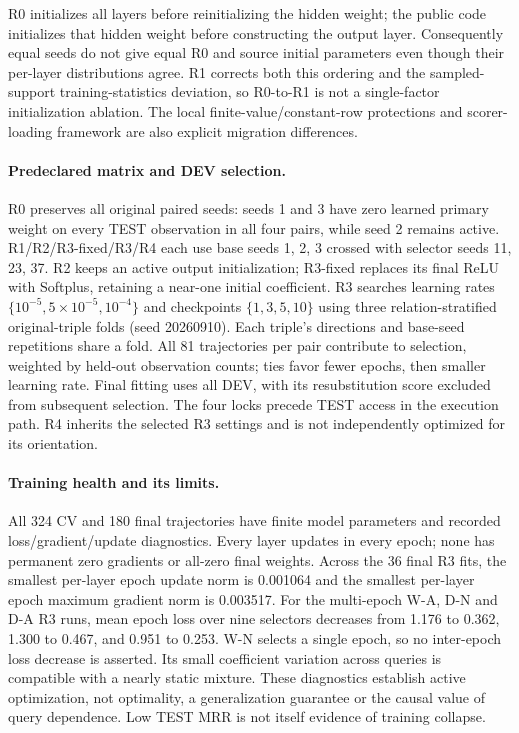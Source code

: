 \documentclass[11pt,a4paper]{article}
\begin{document}
R0 initializes all layers before reinitializing the hidden weight; the public code initializes that hidden weight before constructing the output layer. Consequently equal seeds do not give equal R0 and source initial parameters even though their per-layer distributions agree. R1 corrects both this ordering and the sampled-support training-statistics deviation, so R0-to-R1 is not a single-factor initialization ablation. The local finite-value/constant-row protections and scorer-loading framework are also explicit migration differences.

\paragraph{Predeclared matrix and DEV selection.}
R0 preserves all original paired seeds: seeds 1 and 3 have zero learned primary weight on every TEST observation in all four pairs, while seed 2 remains active. R1/R2/R3-fixed/R3/R4 each use base seeds 1, 2, 3 crossed with selector seeds 11, 23, 37. R2 keeps an active output initialization; R3-fixed replaces its final ReLU with Softplus, retaining a near-one initial coefficient. R3 searches learning rates $\{10^{-5},5\times10^{-5},10^{-4}\}$ and checkpoints $\{1,3,5,10\}$ using three relation-stratified original-triple folds (seed 20260910). Each triple's directions and base-seed repetitions share a fold. All 81 trajectories per pair contribute to selection, weighted by held-out observation counts; ties favor fewer epochs, then smaller learning rate. Final fitting uses all DEV, with its resubstitution score excluded from subsequent selection. The four locks precede TEST access in the execution path. R4 inherits the selected R3 settings and is not independently optimized for its orientation.



\paragraph{Training health and its limits.}
All 324 CV and 180 final trajectories have finite model parameters and recorded loss/gradient/update diagnostics. Every layer updates in every epoch; none has permanent zero gradients or all-zero final weights. Across the 36 final R3 fits, the smallest per-layer epoch update norm is 0.001064 and the smallest per-layer epoch maximum gradient norm is 0.003517. For the multi-epoch W-A, D-N and D-A R3 runs, mean epoch loss over nine selectors decreases from 1.176 to 0.362, 1.300 to 0.467, and 0.951 to 0.253. W-N selects a single epoch, so no inter-epoch loss decrease is asserted. Its small coefficient variation across queries is compatible with a nearly static mixture. These diagnostics establish active optimization, not optimality, a generalization guarantee or the causal value of query dependence. Low TEST MRR is not itself evidence of training collapse.
\end{document}
